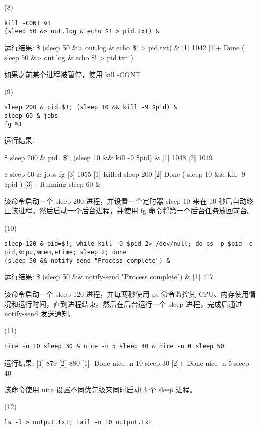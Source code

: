 \documentclass[a4paper, 12pt]{article}
\begin{document}
(8)\begin{verbatim}
kill -CONT %1
(sleep 50 &> out.log & echo $! > pid.txt) &
\end{verbatim}

运行结果:
{\color{blue}
\$ (sleep 50 \&> out.log \& echo \$! > pid.txt) \&
[1] 1042
[1]+  Done                    ( sleep 50 \&> out.log \& echo \$! > pid.txt )
}

如果之前某个进程被暂停，使用 kill -CONT %

(9)\begin{verbatim}
sleep 200 & pid=$!; (sleep 10 && kill -9 $pid) &
sleep 60 & jobs
fg %1
\end{verbatim}

运行结果:
{\color{blue}
\$ sleep 200 \& pid=\$!; (sleep 10 \&\& kill -9 \$pid) \&
[1] 1048
[2] 1049

\$ sleep 60 \& jobs
fg %
[3] 1055
[1]   Killed                  sleep 200
[2]   Done                    ( sleep 10 \&\& kill -9 \$pid )
[3]+  Running                 sleep 60 \&
}

该命令启动一个 sleep 200 进程，并设置一个定时器 sleep 10 来在 10 秒后自动终止该进程。然后启动一个后台进程，并使用 fg 命令将第一个后台任务放回前台。

(10)\begin{verbatim}
sleep 120 & pid=$!; while kill -0 $pid 2> /dev/null; do ps -p $pid -o pid,%cpu,%mem,etime; sleep 2; done
(sleep 50 && notify-send "Process complete") &
\end{verbatim}

运行结果:
{\color{blue}
\$ (sleep 50 \&\& notify-send "Process complete") \&
[1] 417
}

该命令启动一个 sleep 120 进程，并每两秒使用 ps 命令监控其 CPU、内存使用情况和运行时间，直到进程结束。然后在后台运行一个 sleep 进程，完成后通过 notify-send 发送通知。

(11)\begin{verbatim}
nice -n 10 sleep 30 & nice -n 5 sleep 40 & nice -n 0 sleep 50
\end{verbatim}

运行结果:
{\color{blue}
[1] 879
[2] 880
[1]-  Done                    nice -n 10 sleep 30
[2]+  Done                    nice -n 5 sleep 40
}

该命令使用 nice 设置不同优先级来同时启动 3 个 sleep 进程。

(12)\begin{verbatim}
ls -l > output.txt; tail -n 10 output.txt
\end{verbatim}
\end{document}
